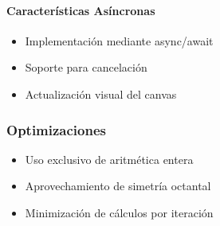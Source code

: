 \documentclass[12pt]{article}
\begin{document}
\paragraph{Características Asíncronas}
\begin{itemize}
    \item Implementación mediante async/await
    \item Soporte para cancelación
    \item Actualización visual del canvas
\end{itemize}

\subsubsection{Optimizaciones}
\begin{itemize}
    \item Uso exclusivo de aritmética entera
    \item Aprovechamiento de simetría octantal
    \item Minimización de cálculos por iteración
\end{itemize}
\end{document}
